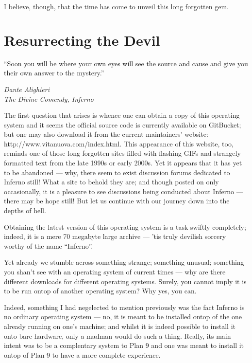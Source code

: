 \documentclass[a5paper,twoside,12pt]{report}
\begin{document}
I believe, though, that the time has come to unveil this long forgotten gem. \newpage

\chapter*{Resurrecting the Devil}

  \epigraph{``Soon you will be where your own eyes will see the source and cause and give you their own answer to the mystery.''}{\textit{Dante Alighieri\\The Divine Comendy, Inferno}}

The first question that arises is whence one can obtain a copy of this operating system and it seems the official source code is currently available on GitBucket; but one may also download it from the current maintainers' website: http://www.vitanuova.com/index.html. This appearance of this website, too, reminds one of those long forgotten sites filled with flashing GIFs and strangely formatted text from the late 1990s or early 2000s. Yet it appears that it has yet to be abandoned — why, there seem to exist discussion forums dedicated to Inferno still! What a site to behold they are; and though posted on only occasionally, it is a pleasure to see discussions being conducted about Inferno — there may be hope still! But let us continue with our journey down into the depths of hell.

Obtaining the latest version of this operating system is a task swiftly completely; indeed, it is a mere 70 megabyte large archive — 'tis truly devilish sorcery worthy of the name  ``Inferno''.

Yet already we stumble across something strange; something unusual; something you shan't see with an operating system of current times — why are there different downloads for different operating systems. Surely, you cannot imply it is to be run ontop of another operating system? Why yes, you can.

Indeed, something I had negelected to mention previously was the fact Inferno is no ordinary operating system — no, it is meant to be installed ontop of the one already running on one's machine; and whilst it is indeed possible to install it onto bare hardware, only a madman would do such a thing. Really, its main intent was to be a complentary system to Plan 9 and one was meant to install it ontop of Plan 9 to have a more complete experience.
\end{document}
